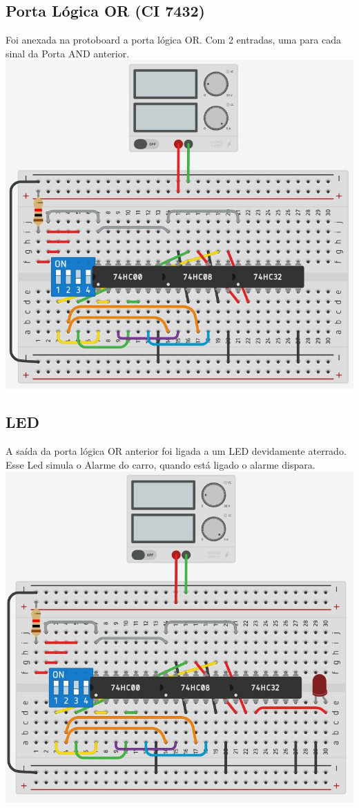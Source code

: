 \documentclass[]{article}
\begin{document}
		\subsection{Porta Lógica OR (CI 7432)}
			Foi anexada na protoboard a porta lógica OR. Com 2 entradas, uma para cada sinal da Porta AND anterior.\\
			\includegraphics[scale=0.5]{Images/Tinkercad 05.jpg} \\
		\subsection{LED}
			A saída da porta lógica OR anterior foi ligada a um LED devidamente aterrado. Esse Led simula o Alarme do carro, quando está ligado o alarme dispara. \\
			\includegraphics[scale=0.5]{Images/Tinkercad 06.jpg} \\
		\pagebreak
\end{document}
